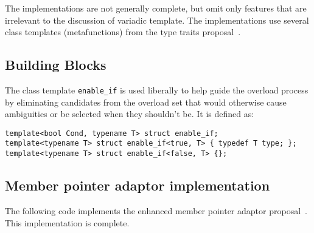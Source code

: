 \documentclass{article}
\begin{document}
The implementations are not generally complete, but omit only features
that are irrelevant to the discussion of variadic template. The
implementations use several class templates (metafunctions) from the
type traits proposal~\cite{Maddock03}.

\subsection{Building Blocks}
\label{building_blocks}
The class template {\tt enable\_if} is used liberally to help guide
the overload process by eliminating candidates from the overload set
that would otherwise cause ambiguities or be selected when they
shouldn't be. It is defined as:

\begin{verbatim}
template<bool Cond, typename T> struct enable_if;
template<typename T> struct enable_if<true, T> { typedef T type; };
template<typename T> struct enable_if<false, T> {};
\end{verbatim}

\subsection{Member pointer adaptor implementation}
\label{mem_fnimpl}
The following code implements the enhanced member pointer adaptor
proposal~\cite{Dimov03a}. This implementation is complete.
\end{document}
